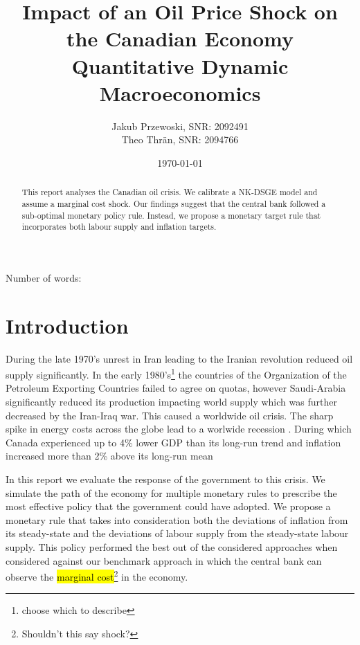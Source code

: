 \documentclass[12pt]{article}
\title{\textbf{Impact of an Oil Price Shock on the Canadian Economy} \\ \large{Quantitative Dynamic Macroeconomics}}
\author{Jakub Przewoski, SNR: 2092491\\ Theo Thrän, SNR: 2094766}
\date{\today}
\begin{document}
\maketitle
{}

\begin{center}
    \large
    Number of words:
    
    \vfill{}
    \begin{abstract}
        This report analyses the Canadian oil crisis. We calibrate a NK-DSGE model and assume a marginal cost shock. Our findings suggest that the central bank followed a sub-optimal monetary policy rule. Instead, we propose a monetary target rule that incorporates both labour supply and inflation targets. 
    \end{abstract}
\end{center}

\newpage

\tableofcontents{}

\newpage

\section{Introduction}
During the late 1970's unrest in Iran leading to the Iranian revolution reduced oil supply significantly\parencite{OilSqueeze1979}. In the early 1980's\footnote{choose which to describe} the countries of the Organization of the Petroleum Exporting Countries failed to agree on quotas, however Saudi-Arabia significantly reduced its production impacting world supply \parencite{tagliabueOPECFAILSSET1982} which was further decreased by the Iran-Iraq war. This caused a worldwide oil crisis. The sharp spike in energy costs across the globe lead to a worlwide recession \parencite{koseGlobalRecessions2020}. During which Canada experienced up to 4\% lower GDP than its long-run trend and inflation increased more than 2\% above its long-run mean 
\parencite{worldbank_inflation_ca,fred_gdp_per_capita_ca}

In this report we evaluate the response of the government to this crisis. We simulate the path of the economy for multiple monetary rules to prescribe the most effective policy that the government could have adopted. We propose a monetary rule that takes into consideration both the deviations of inflation from its steady-state and the deviations of labour supply from the steady-state labour supply. This policy performed the best out of the considered approaches when considered against our benchmark approach in which the central bank can observe the \hl{marginal cost}\footnote{Shouldn't this say shock?} in the economy.
\end{document}
